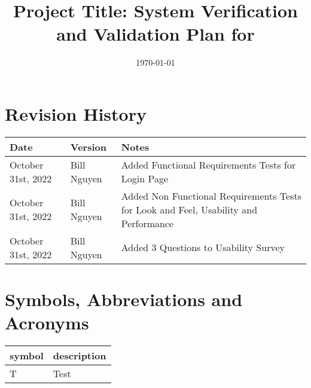 \documentclass[12pt, titlepage]{article}
\begin{document}
\title{Project Title: System Verification and Validation Plan for \progname{}} 
\author{\authname}
\date{\today}
	
\maketitle


\section{Revision History}

\begin{tabularx}{\textwidth}{p{3cm}p{2cm}X}
\toprule {\bf Date} & {\bf Version} & {\bf Notes}\\
\midrule
October 31st, 2022 & Bill Nguyen & Added Functional Requirements Tests for Login Page\\
October 31st, 2022 & Bill Nguyen & Added Non Functional Requirements Tests for Look and Feel, Usability and Performance\\
October 31st, 2022 & Bill Nguyen & Added 3 Questions to Usability Survey\\
\bottomrule
\end{tabularx}

\newpage

\tableofcontents

\listoftables
{}

\listoffigures
{}

\newpage

\section{Symbols, Abbreviations and Acronyms}

\renewcommand{\arraystretch}{1.2}
\begin{tabular}{l l} 
  \toprule		
  \textbf{symbol} & \textbf{description}\\
  \midrule 
  T & Test\\
  \bottomrule
\end{tabular}\\


\newpage

\end{document}
